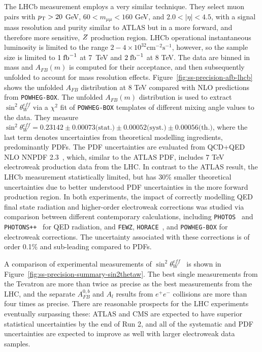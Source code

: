 The LHCb measurement employs a very similar technique.  They select
muon pairs with $p_{\mathrm{T}} > 20$ GeV, $60 < m_{\mu\mu} < 160$ GeV, and $2.0
< |\eta| < 4.5$, with a signal mass resolution and purity similar to
ATLAS but in a more forward, and therefore more sensitive, $Z$
production region.  LHCb operational instantaneous luminosity is
limited to the range $2-4\times
10^{32}\textrm{cm}^{-2}\textrm{s}^{-1}$, however, so the sample size
is limited to $1\;\mbox{fb}^{-1}$ at 7~TeV and $2\;\mbox{fb}^{-1}$ at 8 TeV.  The
data are binned in mass and $A_{FB}(m)$ is computed for their
acceptance, and then subsequently unfolded to account for mass
resolution effects. Figure~\ref{fig:ss-precision-afb-lhcb} shows the
unfolded $A_{FB}$ distribution at 8 TeV compared with NLO predictions
from \texttt{POWHEG-BOX}.  The unfolded $A_{FB}(m)$ distribution is
used to extract $\sin^2\theta^{eff}_{W}$ via a $\chi^2$ fit
of \texttt{POWHEG-BOX} templates of different mixing angle values to
the data.  They measure $\sin^2\theta^{eff}_{W} = 0.23142 \pm
0.00073 \textrm{(stat.)} \pm 0.00052 \textrm{(syst.)} \pm
0.00056 \textrm{(th.)}$, where the last term denotes uncertainties
from theoretical modelling ingredients, predominantly PDFs.  The PDF
uncertainties are evaluated from QCD+QED NLO NNPDF
2.3~\cite{Ball:2013hta,Ball:2012cx}, which, similar to the ATLAS PDF,
includes 7 TeV electroweak production data from the LHC.  In contrast
to the ATLAS result, the LHCb measurement statistically limited, but
has 30\% smaller theoretical uncertainties due to better understood
PDF uncertainties in the more forward production region.  In both
experiments, the impact of correctly modelling QED final state
radiation and higher-order electroweak corrections was studied via
comparison between different contemporary calculations, including
\texttt{PHOTOS}~\cite{Golonka:2005pn} and \texttt{PHOTONS++}~\cite{Schonherr:2008av} for
QED radiation, and \texttt{FEWZ}, \texttt{HORACE}~\cite{CarloniCalame:2007cd}, and
\texttt{POWHEG-BOX} for electroweak corrections.  The uncertainty associated
with these corrections is of order 0.1\% and sub-leading compared to
PDFs.

A comparison of experimental measurements of
$\sin^2\theta^{eff}_{W}$~\cite{Aaltonen:2016nuy} is shown in
Figure~\ref{fig:ss-precision-summary-sin2thetaw}.  The best single
measurements from the Tevatron are more than twice as precise as the
best measurements from the LHC, and the separate $A^{0,b}_{FB}$ and
$A_{l}$ results from $e^+e^-$ collisions are more than four times as
precise.  There are reasonable prospects for the LHC experiments
eventually surpassing these: ATLAS and CMS are expected to have
superior statistical uncertainties by the end of Run 2, and all of the
systematic and PDF uncertainties are expected to improve as well with
larger electroweak data samples.

